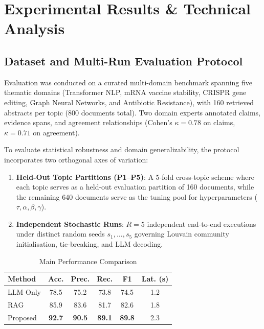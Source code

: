 \documentclass[conference]{IEEEtran}
\begin{document}
\section{Experimental Results \& Technical Analysis}

\subsection{Dataset and Multi-Run Evaluation Protocol}
Evaluation was conducted on a curated multi-domain benchmark spanning five
thematic domains (Transformer NLP, mRNA vaccine stability, CRISPR gene editing,
Graph Neural Networks, and Antibiotic Resistance), with 160 retrieved abstracts
per topic (800 documents total). Two domain experts annotated claims, evidence
spans, and agreement relationships (Cohen's $\kappa = 0.78$ on claims, $\kappa = 0.71$ on agreement).

To evaluate statistical robustness and domain generalizability, the protocol
incorporates two orthogonal axes of variation:
\begin{enumerate}
\item \textbf{Held-Out Topic Partitions (P1--P5)}: A 5-fold cross-topic scheme where each topic serves as a held-out evaluation partition of 160 documents, while the remaining 640 documents serve as the tuning pool for hyperparameters ($\tau, \alpha, \beta, \gamma$).
\item \textbf{Independent Stochastic Runs}: $R=5$ independent end-to-end executions under distinct random seeds $s_1, \dots, s_5$ governing Louvain community initialisation, tie-breaking, and LLM decoding.
\end{enumerate}

\begin{table}[!t]
\caption{Main Performance Comparison}
\label{tab:main}
\centering
\footnotesize
\setlength{\tabcolsep}{3.5pt}
\begin{tabular}{@{}lccccc@{}}
\toprule
\textbf{Method} & \textbf{Acc.} & \textbf{Prec.} & \textbf{Rec.} &
\textbf{F1} & \textbf{Lat. (s)} \\
\midrule
LLM Only & 78.5 & 75.2 & 73.8 & 74.5 & 1.2 \\
RAG      & 85.9 & 83.6 & 81.7 & 82.6 & 1.8 \\
Proposed & \textbf{92.7} & \textbf{90.5} & \textbf{89.1} & \textbf{89.8} & 2.3 \\
\bottomrule
\end{tabular}
\end{table}
\end{document}
